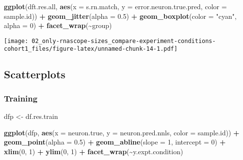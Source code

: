 \documentclass[
]{article}
\newenvironment{Shaded}{\begin{snugshade}}{\end{snugshade}}
\newcommand{\AttributeTok}[1]{\textcolor[rgb]{0.13,0.29,0.53}{#1}}
\newcommand{\DecValTok}[1]{\textcolor[rgb]{0.00,0.00,0.81}{#1}}
\newcommand{\FloatTok}[1]{\textcolor[rgb]{0.00,0.00,0.81}{#1}}
\newcommand{\FunctionTok}[1]{\textcolor[rgb]{0.13,0.29,0.53}{\textbf{#1}}}
\newcommand{\NormalTok}[1]{#1}
\newcommand{\OtherTok}[1]{\textcolor[rgb]{0.56,0.35,0.01}{#1}}
\newcommand{\SpecialCharTok}[1]{\textcolor[rgb]{0.81,0.36,0.00}{\textbf{#1}}}
\newcommand{\StringTok}[1]{\textcolor[rgb]{0.31,0.60,0.02}{#1}}
\begin{document}
\begin{Shaded}
\begin{Highlighting}[]
\FunctionTok{ggplot}\NormalTok{(dft.res.all, }\FunctionTok{aes}\NormalTok{(}\AttributeTok{x =}\NormalTok{ s.rn.match, }\AttributeTok{y =}\NormalTok{ error.neuron.true.pred, }\AttributeTok{color =}\NormalTok{ sample.id)) }\SpecialCharTok{+} 
  \FunctionTok{geom\_jitter}\NormalTok{(}\AttributeTok{alpha =} \FloatTok{0.5}\NormalTok{) }\SpecialCharTok{+} \FunctionTok{geom\_boxplot}\NormalTok{(}\AttributeTok{color =} \StringTok{"cyan"}\NormalTok{, }\AttributeTok{alpha =} \DecValTok{0}\NormalTok{) }\SpecialCharTok{+} \FunctionTok{facet\_wrap}\NormalTok{(}\SpecialCharTok{\textasciitilde{}}\NormalTok{group)}
\end{Highlighting}
\end{Shaded}

\texttt{[image: 02\_only-rnascope-sizes\_compare-experiment-conditions-cohort1\_files/figure-latex/unnamed-chunk-14-1.pdf]}

\hypertarget{scatterplots}{%
\subsection{Scatterplots}\label{scatterplots}}

\hypertarget{training}{%
\subsubsection{Training}\label{training}}

\begin{Shaded}
\begin{Highlighting}[]
\NormalTok{dfp }\OtherTok{\textless{}{-}}\NormalTok{ df.res.train}

\FunctionTok{ggplot}\NormalTok{(dfp, }\FunctionTok{aes}\NormalTok{(}\AttributeTok{x =}\NormalTok{ neuron.true, }\AttributeTok{y =}\NormalTok{ neuron.pred.nnls, }\AttributeTok{color =}\NormalTok{ sample.id)) }\SpecialCharTok{+} 
  \FunctionTok{geom\_point}\NormalTok{(}\AttributeTok{alpha =} \FloatTok{0.5}\NormalTok{) }\SpecialCharTok{+} \FunctionTok{geom\_abline}\NormalTok{(}\AttributeTok{slope =} \DecValTok{1}\NormalTok{, }\AttributeTok{intercept =} \DecValTok{0}\NormalTok{) }\SpecialCharTok{+}
  \FunctionTok{xlim}\NormalTok{(}\DecValTok{0}\NormalTok{, }\DecValTok{1}\NormalTok{) }\SpecialCharTok{+} \FunctionTok{ylim}\NormalTok{(}\DecValTok{0}\NormalTok{, }\DecValTok{1}\NormalTok{) }\SpecialCharTok{+} \FunctionTok{facet\_wrap}\NormalTok{(}\SpecialCharTok{\textasciitilde{}}\NormalTok{y.expt.condition)}
\end{Highlighting}
\end{Shaded}
\end{document}

